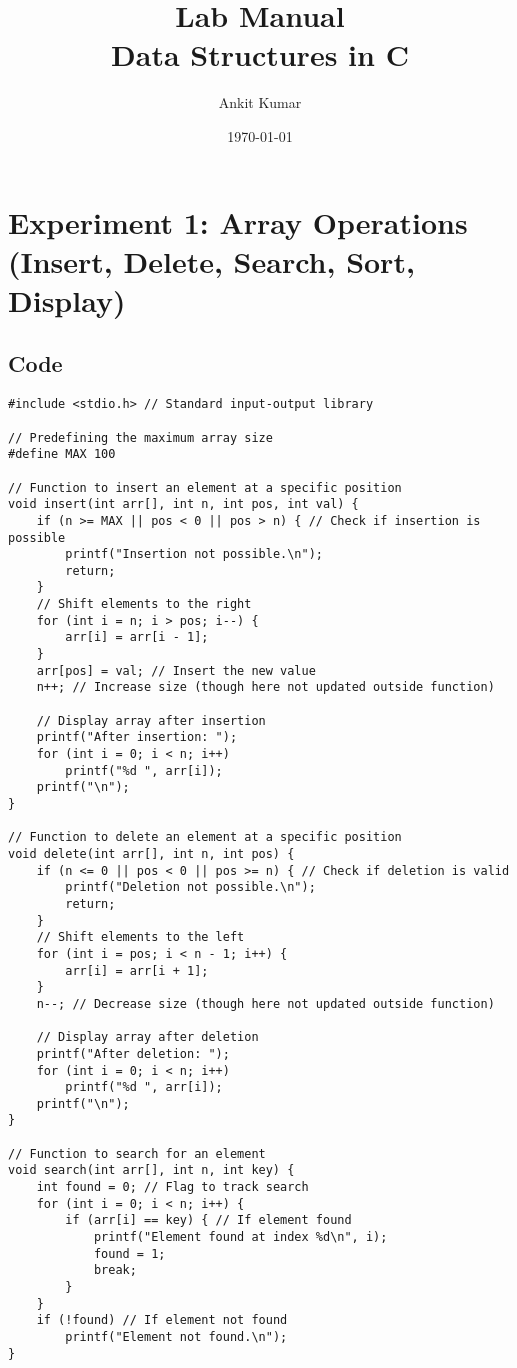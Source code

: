 \documentclass[12pt,a4paper]{article}
\begin{document}
\title{\textbf{Lab Manual}\\Data Structures in C}
\author{Ankit Kumar}
\date{\today}
\maketitle
\newpage
\section*{Experiment 1: Array Operations (Insert, Delete, Search, Sort, Display)}

\subsection*{Code}

\begin{lstlisting}
#include <stdio.h> // Standard input-output library

// Predefining the maximum array size
#define MAX 100

// Function to insert an element at a specific position
void insert(int arr[], int n, int pos, int val) {
    if (n >= MAX || pos < 0 || pos > n) { // Check if insertion is possible
        printf("Insertion not possible.\n");
        return;
    }
    // Shift elements to the right
    for (int i = n; i > pos; i--) {
        arr[i] = arr[i - 1];
    }
    arr[pos] = val; // Insert the new value
    n++; // Increase size (though here not updated outside function)

    // Display array after insertion
    printf("After insertion: ");
    for (int i = 0; i < n; i++)
        printf("%d ", arr[i]);
    printf("\n");
}

// Function to delete an element at a specific position
void delete(int arr[], int n, int pos) {
    if (n <= 0 || pos < 0 || pos >= n) { // Check if deletion is valid
        printf("Deletion not possible.\n");
        return;
    }
    // Shift elements to the left
    for (int i = pos; i < n - 1; i++) {
        arr[i] = arr[i + 1];
    }
    n--; // Decrease size (though here not updated outside function)

    // Display array after deletion
    printf("After deletion: ");
    for (int i = 0; i < n; i++)
        printf("%d ", arr[i]);
    printf("\n");
}

// Function to search for an element
void search(int arr[], int n, int key) {
    int found = 0; // Flag to track search
    for (int i = 0; i < n; i++) {
        if (arr[i] == key) { // If element found
            printf("Element found at index %d\n", i);
            found = 1;
            break;
        }
    }
    if (!found) // If element not found
        printf("Element not found.\n");
}


\end{lstlisting}
\end{document}
